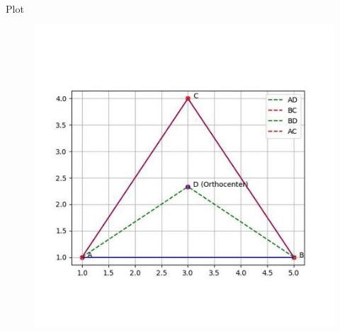 \documentclass{beamer}
\begin{document}
\begin{frame}{Plot}


\begin{figure}[h]
    \centering
    \includegraphics[scale=0.5]{figs/2.10.5.jpg}
    \caption{}
    \label{fig:1}
\end{figure}
\end{frame}
\end{document}
